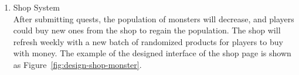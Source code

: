 \documentclass[12pt,oneside,openright,a4paper]{cpe-english-project}
\begin{document}
\begin{itemize}
\begin{enumerate}
	\item Shop System \\
	After submitting quests, the population of monsters will decrease, and players could buy new ones from the shop to regain the population. The shop will refresh weekly with a new batch of randomized products for players to buy with money. The example of the designed interface of the shop page is shown as Figure~\ref{fig:design-shop-monster}. \\

	\begin{minipage}[c]{\textwidth}\centering
	\label{fig:design-shop-monster}
	\end{minipage}


\end{enumerate}
\end{itemize}
\end{document}
